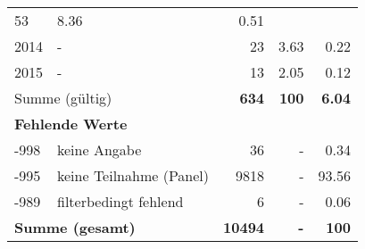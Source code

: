 \begin{longtable}{lXrrr}
       \num{53} &
       \num[round-mode=places,round-precision=2]{8,36} &
         \num[round-mode=places,round-precision=2]{0,51} \\

     2014 &
     \multicolumn{1}{X}{ -  } &


       \num{23} &
       \num[round-mode=places,round-precision=2]{3,63} &
         \num[round-mode=places,round-precision=2]{0,22} \\

     2015 &
     \multicolumn{1}{X}{ -  } &


       \num{13} &
       \num[round-mode=places,round-precision=2]{2,05} &
         \num[round-mode=places,round-precision=2]{0,12} \\
     \midrule
     \multicolumn{2}{l}{Summe (gültig)} &
       \textbf{\num{634}} &
     \textbf{100} &
       \textbf{\num[round-mode=places,round-precision=2]{6,04}} \\
     \multicolumn{5}{l}{\textbf{Fehlende Werte}}\\
       -998 &
       keine Angabe &
         \num{36} &
        - &
         \num[round-mode=places,round-precision=2]{0,34} \\
       -995 &
       keine Teilnahme (Panel) &
         \num{9818} &
        - &
         \num[round-mode=places,round-precision=2]{93,56} \\
       -989 &
       filterbedingt fehlend &
         \num{6} &
        - &
         \num[round-mode=places,round-precision=2]{0,06} \\
     \midrule
     \multicolumn{2}{l}{\textbf{Summe (gesamt)}} &
          \textbf{\num{10494}} &
        \textbf{-} &
        \textbf{100} \\
     \bottomrule
     \end{longtable}
     
